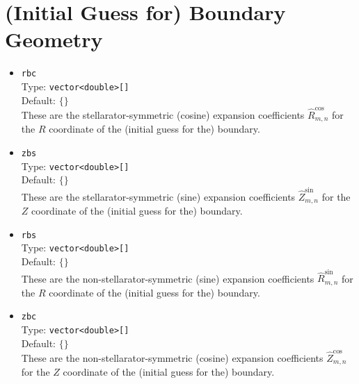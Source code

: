 \section{(Initial Guess for) Boundary Geometry}

\begin{itemize}

 \item \texttt{rbc} \\
       Type: \texttt{vector<double>[]} \\
       Default: $\{ \}$ \\
       These are the stellarator-symmetric (cosine) expansion coefficients $\hat{R}_{m, n}^{\cos}$ for the $R$ coordinate of the (initial guess for the) boundary.

 \item \texttt{zbs} \\
       Type: \texttt{vector<double>[]} \\
       Default: $\{ \}$ \\
       These are the stellarator-symmetric (sine) expansion coefficients $\hat{Z}_{m, n}^{\sin}$ for the $Z$ coordinate of the (initial guess for the) boundary.

 \item \texttt{rbs} \\
       Type: \texttt{vector<double>[]} \\
       Default: $\{ \}$ \\
       These are the non-stellarator-symmetric (sine) expansion coefficients $\hat{R}_{m, n}^{\sin}$ for the $R$ coordinate of the (initial guess for the) boundary.

 \item \texttt{zbc} \\
       Type: \texttt{vector<double>[]} \\
       Default: $\{ \}$ \\
       These are the non-stellarator-symmetric (cosine) expansion coefficients $\hat{Z}_{m, n}^{\cos}$ for the $Z$ coordinate of the (initial guess for the) boundary.

\end{itemize}
